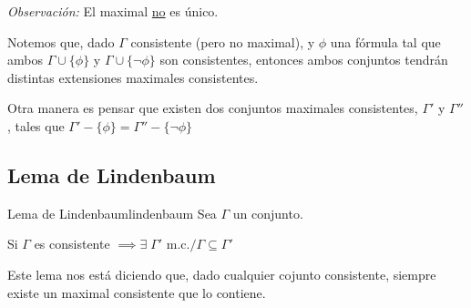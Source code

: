 \bigskip
\textit{Observación:}
El maximal \underline{no} es único.

Notemos que, dado $\Gamma$ consistente (pero no maximal), y $\phi$ una fórmula
tal que ambos $\Gamma \cup \{ \phi \}$ y $\Gamma \cup \{ \neg \phi \}$ son
consistentes, entonces ambos conjuntos tendrán distintas extensiones maximales
consistentes.

Otra manera es pensar que existen dos conjuntos maximales consistentes,
$\Gamma '$ y $\Gamma ''$, tales que 
$\Gamma ' - \{ \phi \} = \Gamma '' - \{ \neg \phi \}$

\subsection{Lema de Lindenbaum}

\begin{lema}{Lema de Lindenbaum}{lindenbaum}
    Sea $\Gamma$ un conjunto.

    \medskip

    Si $\Gamma$ es consistente $\implies \exists \; \Gamma' \text{ m.c.}/
    \Gamma \subseteq \Gamma'$ 
\end{lema}


Este lema nos está diciendo que, dado cualquier cojunto consistente, siempre
existe un maximal consistente que lo contiene.


